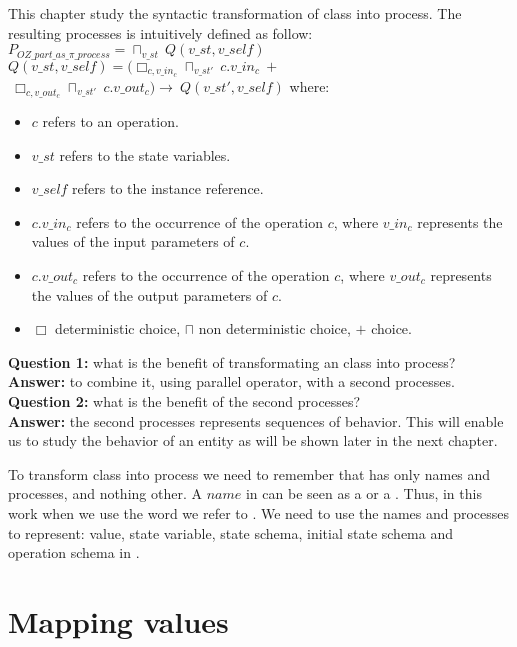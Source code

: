 This chapter study the syntactic transformation of \oz{} class into \picalc{} process. The resulting processes is intuitively defined as follow:\\
$P_{OZ\_part\_as\_\pi\_process} = \sqcap _{v\_st}\ Q(v\_st,v\_self)$\\
$Q(v\_st,v\_self) = (\Box _{c,v\_in_{c}} \sqcap _{v\_st'} \ c.v\_in_{c} \ +$ \\ $ \ \Box _{c,v\_out_{c}} \sqcap _{v\_st'} \ c.v\_out_{c})\rightarrow \ Q(v\_st',v\_self)$
where:
\begin{itemize}
\item $c$ refers to an operation.
\item $v\_st$ refers to the state variables.
\item $v\_self$ refers to the instance reference.
\item $c.v\_in_{c}$ refers to the occurrence of the operation $c$, where $v\_in_{c}$ represents the values of the input parameters of $c$.
\item $c.v\_out_{c}$ refers to the occurrence of the operation $c$, where $v\_out_{c}$ represents the values of the output parameters of $c$.
\item $\Box$ deterministic choice, $\sqcap$ non deterministic choice, $+$ choice.
\end{itemize}
\textbf{Question 1:} what is the benefit of transformating an \oz{} class into \picalc{} process?\\
\textbf{Answer:} to combine it, using parallel operator, with a second \picalc{} processes.
\textbf{Question 2:} what is the benefit of the  second processes?\\
\textbf{Answer:} the second processes represents sequences of behavior. This will enable us to study the behavior of an entity as will be shown later in the next chapter.

To transform \oz{} class into \picalc{} process we need to remember that  \picalc{} has only names and processes, and nothing other. A $name$ in \picalc{} can be seen as a  or a . Thus, in this work when we use the word  we refer to \picalc{} . We need to use the names and processes to represent: value, state variable, state schema, initial state schema and operation schema in \picalc{}.
\section{Mapping values}
\label{sec_tra_mapping_values}


